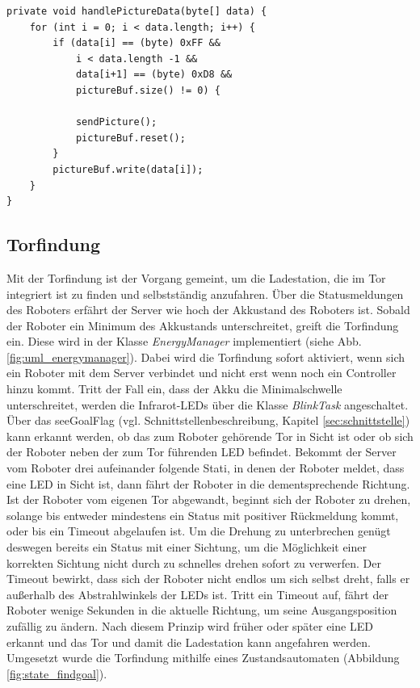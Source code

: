 \begin{lstlisting}
private void handlePictureData(byte[] data) {
	for (int i = 0; i < data.length; i++) {
		if (data[i] == (byte) 0xFF && 
			i < data.length -1 && 
			data[i+1] == (byte) 0xD8 && 
			pictureBuf.size() != 0) {
			
			sendPicture();
			pictureBuf.reset();
		}
		pictureBuf.write(data[i]);
	}
}
\end{lstlisting}



\subsection{Torfindung}
\label{sec:torfindung}
Mit der Torfindung ist der Vorgang gemeint, um die Ladestation, die im Tor integriert ist zu finden und selbstständig anzufahren. Über die Statusmeldungen des Roboters erfährt der Server wie hoch der Akkustand des Roboters ist. Sobald der Roboter ein Minimum des Akkustands unterschreitet, greift die Torfindung ein. Diese wird in der Klasse \textit{EnergyManager} implementiert (siehe Abb. \ref{fig:uml_energymanager}). Dabei wird die Torfindung sofort aktiviert, wenn sich ein Roboter mit dem Server verbindet und nicht erst wenn noch ein Controller hinzu kommt. Tritt der Fall ein, dass der Akku die Minimalschwelle unterschreitet, werden die Infrarot-LEDs über die Klasse \textit{BlinkTask} angeschaltet. Über das \glqq seeGoal\grqq Flag (vgl. Schnittstellenbeschreibung, Kapitel \ref{sec:schnittstelle}) kann erkannt werden, ob das zum Roboter gehörende Tor in Sicht ist oder ob sich der Roboter neben der zum Tor führenden LED befindet. Bekommt der Server vom Roboter drei aufeinander folgende Stati, in denen der Roboter meldet, dass eine LED in Sicht ist, dann fährt der Roboter in die dementsprechende Richtung. Ist der Roboter vom eigenen Tor abgewandt, beginnt sich der Roboter zu drehen, solange bis entweder mindestens ein Status mit positiver Rückmeldung kommt, oder bis ein Timeout abgelaufen ist. Um die Drehung zu unterbrechen genügt deswegen bereits ein Status mit einer Sichtung, um die Möglichkeit einer korrekten Sichtung nicht durch zu schnelles drehen sofort zu verwerfen. Der Timeout bewirkt, dass sich der Roboter nicht endlos um sich selbst dreht, falls er außerhalb des Abstrahlwinkels der LEDs ist. Tritt ein Timeout auf, fährt der Roboter wenige Sekunden in die aktuelle Richtung, um seine Ausgangsposition zufällig zu ändern. Nach diesem Prinzip wird früher oder später eine LED erkannt und das Tor und damit die Ladestation kann angefahren werden. \\ Umgesetzt wurde die Torfindung mithilfe eines Zustandsautomaten (Abbildung \ref{fig:state_findgoal}).


